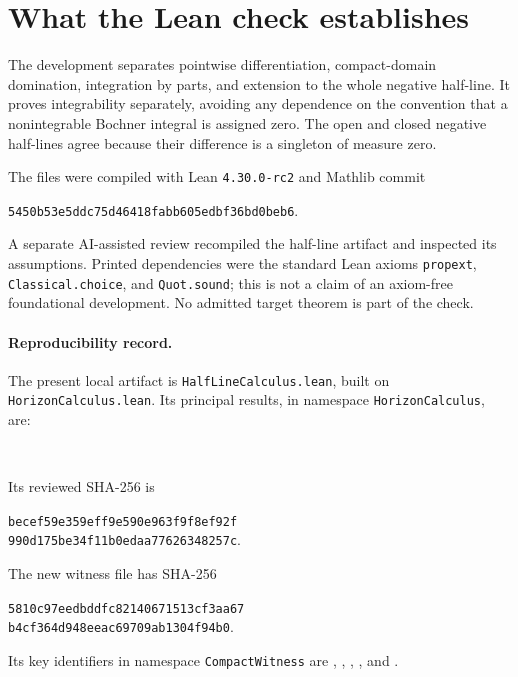 \documentclass[11pt]{article}
\begin{document}
\section{What the Lean check establishes}
The development separates pointwise differentiation, compact-domain domination, integration by parts, and extension to the whole negative half-line. It proves integrability separately, avoiding any dependence on the convention that a nonintegrable Bochner integral is assigned zero. The open and closed negative half-lines agree because their difference is a singleton of measure zero.

The files were compiled with Lean \texttt{4.30.0-rc2} and Mathlib commit
\begin{center}\texttt{5450b53e5ddc75d46418fabb605edbf36bd0beb6}.\end{center}
A separate AI-assisted review recompiled the half-line artifact and inspected its assumptions. Printed dependencies were the standard Lean axioms \texttt{propext}, \texttt{Classical.choice}, and \texttt{Quot.sound}; this is not a claim of an axiom-free foundational development. No admitted target theorem is part of the check.

\paragraph{Reproducibility record.}
The present local artifact is \texttt{HalfLineCalculus.lean}, built on \texttt{HorizonCalculus.lean}. Its principal results, in namespace \texttt{HorizonCalculus}, are:
\begin{flushleft}\small
{}\\
\end{flushleft}
Its reviewed SHA-256 is
\begin{center}\small\texttt{becef59e359eff9e590e963f9f8ef92f}\\
\texttt{990d175be34f11b0edaa77626348257c}.\end{center}
The new witness file has SHA-256
\begin{center}\small\texttt{5810c97eedbddfc82140671513cf3aa67}\\
\texttt{b4cf364d948eeac69709ab1304f94b0}.\end{center}
Its key identifiers in namespace \texttt{CompactWitness} are
, ,
, ,
and .
\end{document}
